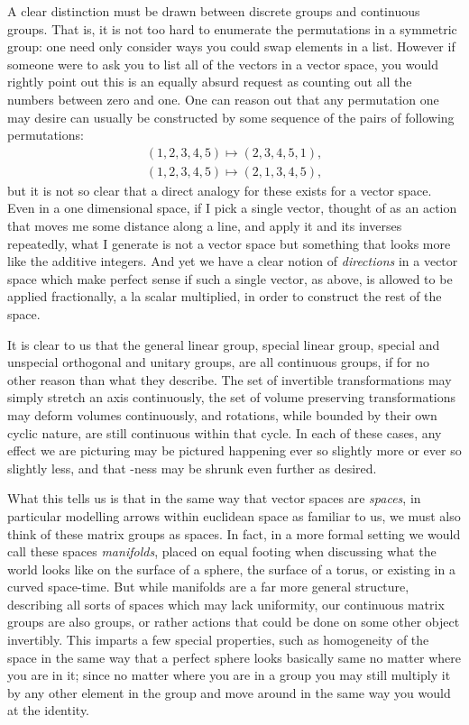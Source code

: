 \documentclass[11pt]{article}
\begin{document}
A clear distinction must be drawn between discrete groups and continuous groups. That is, it is not too hard to enumerate the permutations in a symmetric group: one need only consider ways you could swap elements in a list. However if someone were to ask you to list all of the vectors in a vector space, you would rightly point out this is an equally absurd request as counting out all the numbers between zero and one. One can reason out that any permutation one may desire can usually be constructed by some sequence of the pairs of following permutations: \begin{gather*}
(1,2,3,4,5) \mapsto (2,3,4,5,1), \\
(1,2,3,4,5) \mapsto (2,1,3,4,5),
\end{gather*}
but it is not so clear that a direct analogy for these exists for a vector space. Even in a one dimensional space, if I pick a single vector, thought of as an action that moves me some distance along a line, and apply it and its inverses repeatedly, what I generate is not a vector space but something that looks more like the additive integers. And yet we have a clear notion of \emph{directions} in a vector space which make perfect sense if such a single vector, as above, is allowed to be applied fractionally, a la scalar multiplied, in order to construct the rest of the space.

It is clear to us that the general linear group, special linear group, special and unspecial orthogonal and unitary groups, are all continuous groups, if for no other reason than what they describe. The set of invertible transformations may simply stretch an axis continuously, the set of volume preserving transformations may deform volumes continuously, and rotations, while bounded by their own cyclic nature, are still continuous within that cycle. In each of these cases, any effect we are picturing may be pictured happening ever so slightly more or ever so slightly less, and that -ness may be shrunk even further as desired.

What this tells us is that in the same way that vector spaces are \emph{spaces}, in particular modelling arrows within euclidean space as familiar to us, we must also think of these matrix groups as spaces. In fact, in a more formal setting we would call these spaces \emph{manifolds}, placed on equal footing when discussing what the world looks like on the surface of a sphere, the surface of a torus, or existing in a curved space-time. But while manifolds are a far more general structure, describing all sorts of spaces which may lack uniformity, our continuous matrix groups are also groups, or rather actions that could be done on some other object invertibly. This imparts a few special properties, such as homogeneity of the space in the same way that a perfect sphere looks basically same no matter where you are in it; since no matter where you are in a group you may still multiply it by any other element in the group and move around in the same way you would at the identity.
\end{document}
